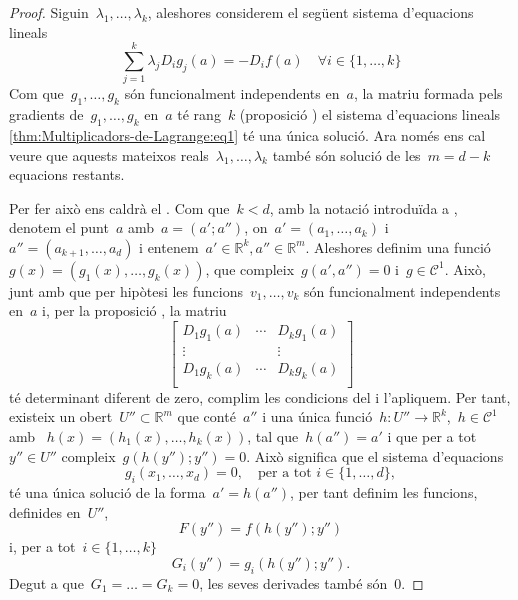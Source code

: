\documentclass[../../main.tex]{subfiles}
\begin{document}
    \begin{proof}
        Siguin~\(\lambda_{1},\dots,\lambda_{k}\), aleshores considerem el següent sistema d'equacions lineals
        \begin{equation}\label{thm:Multiplicadors-de-Lagrange:eq1}
        \sum_{j=1}^{k}\lambda_{j}D_{i}g_{j}(a)=-D_{i}f(a)\quad\forall i\in\{1,\dots,k\}
        \end{equation}
        Com que~\(g_{1},\dots,g_{k}\) són funcionalment independents en~\(a\),
        la matriu formada pels gradients de~\(g_{1},\dots,g_{k}\) en~\(a\) té
        rang~\(k\) (proposició ) el sistema d'equacions lineals \eqref{thm:Multiplicadors-de-Lagrange:eq1} té una única solució.
        Ara només ens cal veure que aquests mateixos reals~\(\lambda_{1},\dots,\lambda_{k}\) també són solució de les~\(m=d-k\) equacions restants.

        Per fer això ens caldrà el .
        Com que~\(k<d\), amb la notació introduïda a , denotem el punt~\(a\) amb~\(a=(a';a'')\), on~\(a'=(a_{1},\dots,a_{k})\) i~\(a''=(a_{k+1},\dots,a_{d})\) i entenem~\(a'\in\mathbb{R}^{k},a''\in\mathbb{R}^{m}\).
        Aleshores definim una funció~\(g(x)=(g_{1}(x),\dots,g_{k}(x))\), que compleix~\(g(a',a'')=0\) i~\(g\in\mathcal{C}^{1}\).
        Això, junt amb que per hipòtesi les funcions~\(v_{1},\dots,v_{k}\) són funcionalment independents en~\(a\) i, per la proposició , la matriu
        \[\left[\begin{matrix}
        D_{1}g_{1}(a) & \cdots & D_{k}g_{1}(a)\\
        \vdots & & \vdots\\
        D_{1}g_{k}(a) & \cdots & D_{k}g_{k}(a)\\
        \end{matrix}\right]\]
        té determinant diferent de zero, complim les condicions del  i l'apliquem.
        Per tant, existeix un obert~\(U''\subset\mathbb{R}^{m}\) que conté~\(a''\) i una única funció~\(h\colon U''\to\mathbb{R}^{k}\),~\(h\in\mathcal{C}^{1}\) amb ~\(h(x)=(h_{1}(x),\dots,h_{k}(x))\), tal que~\(h(a'')=a'\) i que per a tot~\(y''\in U''\) compleix~\(g(h(y'');y'')=0\).
        Això significa que el sistema d'equacions
        \[
            g_{i}(x_{1},\dots,x_{d})=0,\quad\text{per a tot }i\in\{1,\dots,d\},
        \]
        té una única solució de la forma~\(a'=h(a'')\), per tant definim les funcions, definides en~\(U''\),
        \[
            F(y'')=f(h(y'');y'')
        \]
        i, per a tot~\(i\in\{1,\dots,k\}\)
        \[
            G_{i}(y'')=g_{i}(h(y'');y'').
        \]
        Degut a que~\(G_{1}=\dots=G_{k}=0\), les seves derivades també són~\(0\).
    \end{proof}
\end{document}
